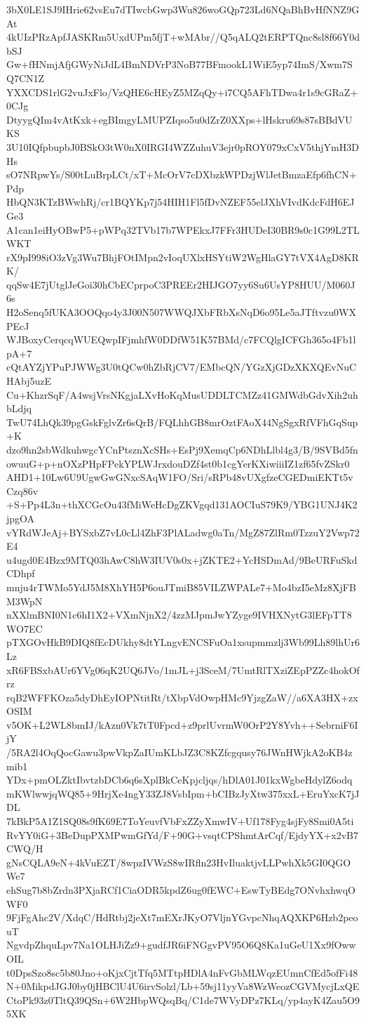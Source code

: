 3bX0LE1SJ9IHrie62vsEu7dTIwcbGwp3Wu826woGQp723Ld6NQaBhBvHfNNZ9GAt
4kUIzPRzApfJASKRm5UxdUPm5fjT+wMAbr//Q5qALQ2tERPTQnc8sl8f66Y0dbSJ
Gw+fHNmjAfjGWyNiJdL4BmNDVrP3NoB77BFmookL1WiE5yp74ImS/Xwm7SQ7CN1Z
YXXCDS1rlG2vuJxFlo/VzQHE6cHEyZ5MZqQy+i7CQ5AFhTDwa4r1s9cGRaZ+0CJg
DtyygQIm4vAtKxk+egBImgyLMUPZIqso5u0dZrZ0XXps+lHskru69s87sBBdVUKS
3U10IQfpbupbJ0BSkO3tW0nX0IRGI4WZZuhuV3ejr0pROY079xCxV5thjYmH3DHs
sO7NRpwYs/S00tLuBrpLCt/xT+McOrV7cDXbzkWPDzjWlJetBmzaEfp6fhCN+Pdp
HbQN3KTzBWwhRj/cr1BQYKp7j54HIH1Fl5fDvNZEF55elJXhVIvdKdcFdH6EJGe3
A1can1eiHyOBwP5+pWPq32TVb17b7WPEkxJ7FFr3HUDeI30BR9s0c1G99L2TLWKT
rX9pI998iO3zVg3Wu7BhjFOtIMpn2vIoqUXlxHSYtiW2WgHlaGY7tVX4AgD8KRK/
qqSw4E7jUtglJeGoi30hCbECprpoC3PREEr2HIJGO7yy6Su6UsYP8HUU/M060J6s
H2oSenq5fUKA3OOQqo4y3J00N507WWQJXbFRbXsNqD6o95Le5aJTftvzu0WXPEcJ
WJBoxyCerqcqWUEQwpIFjmhfW0DDfW51K57BMd/c7FCQlgICFGh365o4Fb1lpA+7
cQtAYZjYPuPJWWg3U0tQCw0hZbRjCV7/EMbcQN/YGzXjGDzXKXQEvNuCHAbj5uzE
Cu+KhzrSqF/A4wsjVrsNKgjaLXvHoKqMusUDDLTCMZz41GMWdbGdvXih2uhbLdjq
TwU74LhQk39pgGskFglvZr6sQrB/FQLhhGB8mrOztFAoX44NgSgxRfVFhGqSup+K
dzo9hn2sbWdkuhwgcYCnPtsznXcSHs+EsPj9XemqCp6NDhLlbl4g3/B/9SVBd5fn
owuuG+p+nOXzPHpFPekYPLWJrxdouDZf4st0b1cgYerKXiwiiiIZ1zf65fvZSkr0
AHD1+10Lw6U9UgwGwGNxcSAqW1FO/Sri/sRPb48vUXgfzeCGEDmiEKTt5vCzq86v
+S+Pp4L3n+thXCGcOu43fMiWeHcDgZKVgqd131AOCIuS79K9/YBG1UNJ4K2jpgOA
vYRdWJeAj+BYSxbZ7vL0cLl4ZhF3PlALadwg0aTn/MgZ87ZlRm0TzzuY2Vwp72E4
u4ugd0E4Bzx9MTQ03hAwC8hW3IUV0s0x+jZKTE2+YcHSDmAd/9BeURFuSkdCDhpf
mnju4rTWMo5YdJ5M8XhYH5P6ouJTmiB85VILZWPALe7+Mo4bzI5eMz8XjFBM3WpN
nXXlmBNI0N1c6hI1X2+VXmNjnX2/4zzMJpmJwYZyge9IVHXNytG3lEFpTT8WO7EC
pTXGOvHkB9DIQ8fEcDUkhy8dtYLngvENCSFuOa1xsupmmzlj3Wb99Lh89lhUr6Lz
xR6FBSxbAUr6YVg06qK2UQ6JVo/1mJL+j3SceM/7UmtRlTXziZEpPZZc4hokOfrz
rqB2WFFKOza5dyDhEyIOPNtitRt/tXbpVdOwpHMc9YjzgZaW//a6XA3HX+zxOSIM
v5OK+L2WL8bmIJ/kAzn0Vk7tT0Fpcd+z9prlUvrmW0OrP2Y8Yvh++SebrniF6IjY
/5RA2l4OqQocGawu3pwVkpZaIUmKLbJZ3C8KZfcgqusy76JWnHWjkA2oKB4zmib1
YDx+pmOLZktIbvtzbDCb6q6sXplBkCeKpjcljqs/hDlA01J01kxWgbeHdylZ6odq
mKWlwwjqWQ85+9HrjXe4ngY33ZJ8VsbIpm+bCIBzJyXtw375xxL+EruYxcK7jJDL
7kBkP5A1Z1SQ08s9fK69E7ToYeuvfVbFxZZyXmwIV+Uf178Fyg4sjFy8Smi0A5ti
RvYY0iG+3BeDupPXMPwmGfYd/F+90G+vsqtCPShmtArCqf/EjdyYX+x2vB7CWQ/H
gNsCQLA9eN+4kVuEZT/8wpzIVWzS8wIRfln23HvIluaktjvLLPwhXk5GI0QGOWe7
ehSug7b8bZrdn3PXjaRCf1CiaODR5kpdZ6ug0fEWC+EswTyBEdg7ONvhxhwqOWF0
9FjFgAhc2V/XdqC/HdRtbj2jeXt7mEXrJKyO7VljnYGvpcNhqAQXKP6Hzb2peouT
NgvdpZhquLpv7Na1OLHJiZz9+gudfJR6iFNGgvPV95O6Q8Ka1uGeU1Xx9fOwwOIL
t0DpsSzo8sc5b80Jno+oKjxCjtTfq5MTtpHDlA4nFvGbMLWqzEUmnCfEd5ofFi48
N+0MikpdJGJ0by0jHBClU4U6irvSolzl/Lb+59sj11yyVa8WzWeozCGVMycjLxQE
CtoPk93z0TltQ39QSn+6W2HbpWQsqBq/C1de7WVyDPz7KLq/yp4ayK4Zau5O95XK
